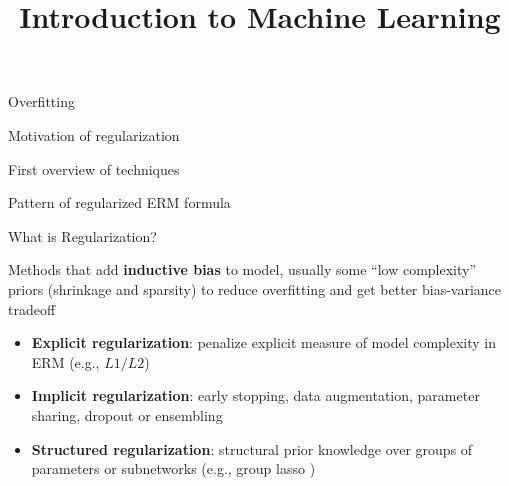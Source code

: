 \documentclass[11pt,compress,t,notes=noshow, xcolor=table]{beamer}
\title{Introduction to Machine Learning}
\begin{document}
{
    \item Overfitting
    \item Motivation of regularization
    \item First overview of techniques
    \item Pattern of regularized ERM formula
    }

\begin{vbframe}{What is Regularization?}

Methods that add \textbf{inductive bias} to model, usually some ``low complexity'' priors (shrinkage and sparsity) to reduce overfitting and get better bias-variance tradeoff

\lz \lz

\begin{itemize}
\setlength{\itemsep}{1.0em}
    \item \textbf{Explicit regularization}: penalize explicit measure of model complexity in ERM (e.g., $L1/L2$)
    \item \textbf{Implicit regularization}: early stopping, data augmentation, parameter sharing, dropout or ensembling
    \item \textbf{Structured regularization}: structural prior knowledge over groups of parameters or subnetworks (e.g., group lasso )
\end{itemize}

\end{vbframe}
\end{document}
